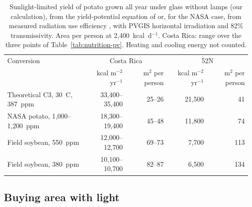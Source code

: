 \begin{table}[H]
\centering
\caption{Sunlight-limited yield of potato grown all year under glass without lamps (our calculation), from the yield-potential equation of \cite[Eq.~1, p.~238]{zhu2010photosynthesis} or, for the NASA case, from measured radiation use efficiency \cite[Table~2, p.~711]{wheeler2008crop}, with PVGIS horizontal irradiation and 82\% transmissivity. Area per person at 2{,}400~kcal~d$^{-1}$. Costa Rica: range over the three points of Table~\ref{tab:nutrition-pv}. Heating and cooling energy not counted.}
\label{tab:nutrition-ceiling}
\begin{tabular}{lrrrr}
\toprule
Conversion & \multicolumn{2}{c}{Costa Rica} & \multicolumn{2}{c}{52\textdegree{}N} \\
 & kcal m$^{-2}$ yr$^{-1}$ & m$^2$ per person & kcal m$^{-2}$ yr$^{-1}$ & m$^2$ per person \\
\midrule
Theoretical C3, 30~\textdegree{}C, 387~ppm & 33{,}400--35{,}400 & 25--26 & 21{,}500 & 41 \\
NASA potato, 1{,}000--1{,}200~ppm & 18{,}300--19{,}400 & 45--48 & 11{,}800 & 74 \\
Field soybean, 550~ppm & 12{,}000--12{,}700 & 69--73 & 7{,}700 & 113 \\
Field soybean, 380~ppm & 10{,}100--10{,}700 & 82--87 & 6{,}500 & 134 \\
\bottomrule
\end{tabular}
\end{table}

\subsection{Buying area with light}\label{sec:nutrition-ce}

